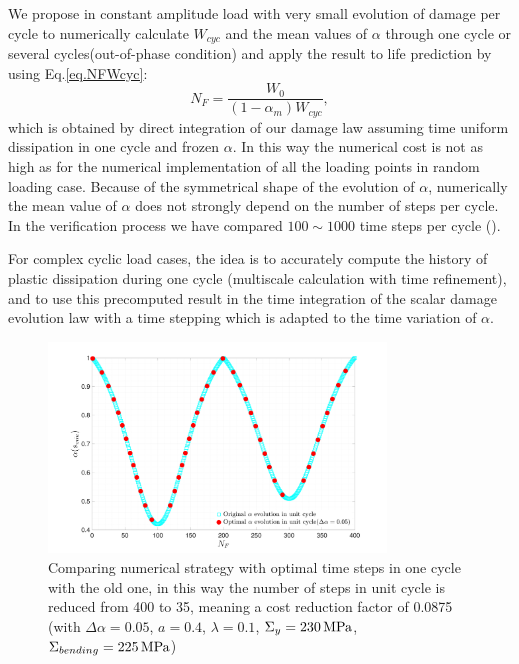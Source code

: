 We propose in constant amplitude load with very small evolution of damage per cycle to numerically calculate $W_{cyc}$ and the mean values of $\alpha$ through one cycle or several cycles(out-of-phase condition) and apply the result to life prediction by using  Eq.\eqref{eq.NFWcyc}:
\begin{equation}
N_F= \dfrac{W_0}{\left( 1-\alpha_m\right) W_{cyc}},
\label{eq.cycNF}
\end{equation}
which is obtained by direct integration of our damage law assuming time uniform dissipation in one cycle and frozen $\alpha$.
In this way the numerical cost is not as high as for the numerical implementation of all the loading points in random loading case. Because of the symmetrical shape of the evolution of $\alpha$, numerically the mean value of $\alpha$ does not strongly depend on the number of steps per cycle. In the verification process we have compared $100\sim1000$ time steps per cycle (). 

For complex cyclic load cases, the idea is to accurately compute the history of plastic dissipation during one cycle (multiscale calculation with time refinement), and to use this precomputed result in the time integration of the scalar damage evolution law with a time stepping which is adapted to the time variation of $\alpha$. 

\begin{figure}[!h]
	\centering
	\includegraphics[width=0.8\textwidth]{figures//alpha_opt_vs_alpha_stepnumber.png} 
	\caption{Comparing numerical strategy with optimal time steps in one cycle with the old one, in this way the number of steps in unit cycle is reduced from 400 to 35, meaning a cost reduction factor of 0.0875 (with $\Delta\alpha=0.05$, $a=0.4$, $\lambda=0.1$, $\Sigma_y=230 \,\textnormal{MPa}$, $\Sigma_{bending}=225 \,\textnormal{MPa}$)}
	\label{fig.alpha_opt_vs_alpha_stepnumber}
\end{figure}

